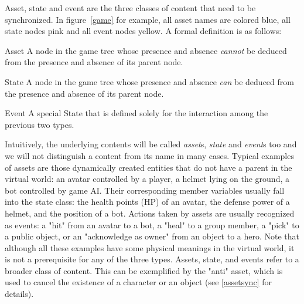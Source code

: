 Asset, state and event are the three classes of content that need to be synchronized. In figure~\ref{game} for example, all asset names are colored blue, all state nodes pink and all event nodes yellow. A formal definition is as follows:
\begin{description*} 
\item [Asset]
A node in the game tree whose presence and absence \emph{cannot} be deduced from the presence and absence of its parent node.
\item [State]
A node in the game tree whose presence and absence \emph{can} be deduced from the presence and absence of its parent node.
\item [Event]
A special State that is defined solely for the interaction among the previous two types.
\end{description*}
Intuitively, the underlying contents will be called \emph{asset}s, \emph{state} and \emph{event}s too and we will not distinguish a content from its name in many cases. Typical examples of assets are those dynamically created entities that do not have a parent in the virtual world: an avatar controlled by a player, a helmet lying on the ground, a bot controlled by game AI. Their corresponding member variables usually fall into the state class: the health points (HP) of an avatar, the defense power of a helmet, and the position of a bot. Actions taken by assets are usually recognized as events: a "hit" from an avatar to a bot, a "heal" to a group member, a "pick" to a public object, or an "acknowledge as owner" from an object to a hero. Note that although all these examples have some physical meanings in the virtual world, it is not a prerequisite for any of the three types. Assets, state, and events refer to a broader class of content. This can be exemplified by the "{anti}" asset, which is used to cancel the existence of a character or an object (see \ref{assetsync} for details).

